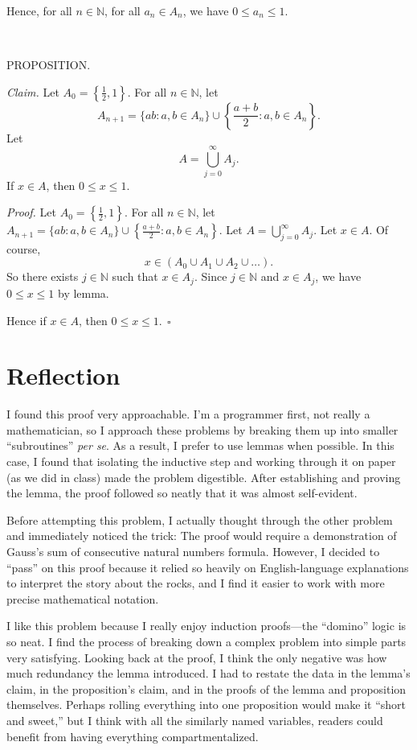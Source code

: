 \documentclass[9pt]{article}
\begin{document}
\noindent Hence, for all $n\in\mathbb{N}$, for all $a_n\in A_n$, we have $0\leq a_n\leq 1$.\newline

~\newline

\noindent\small{PROPOSITION.}\newline

\noindent\textit{Claim. }Let $A_0=\left\{\frac{1}{2},1
\right\}$. For all $n\in\mathbb{N}$, let
\[A_{n+1}=\{ab:a,b\in A_n\}\cup\left\{\frac{a+b}{2}:a,b\in A_n\right\}.\]
Let
\[A=\bigcup_{j=0}^{\infty}{A_j}.\]
If $x\in A$, then $0\leq x\leq 1$.\newline

\noindent\textit{Proof. }Let $A_0=\left\{\frac{1}{2},1
\right\}$. For all $n\in\mathbb{N}$, let $A_{n+1}=\{ab:a,b\in A_n\}\cup\left\{\frac{a+b}{2}:a,b\in A_n\right\}$. Let $A=\bigcup_{j=0}^{\infty}{A_j}$. Let $x\in A$. Of course,
\[x\in(A_0\cup A_1\cup A_2\cup\dots).\]
So there exists $j\in\mathbb{N}$ such that $x\in A_j$. Since $j\in\mathbb{N}$ and $x\in A_j$, we have $0\leq x\leq 1$ by lemma.\newline

\noindent Hence if $x\in A$, then $0\leq x\leq 1.~~\square$
\section*{Reflection}
I found this proof very approachable. I'm a programmer first, not really a mathematician, so I approach these problems by breaking them up into smaller ``subroutines'' \textit{per se}. As a result, I prefer to use lemmas when possible. In this case, I found that isolating the inductive step and working through it on paper (as we did in class) made the problem digestible. After establishing and proving the lemma, the proof followed so neatly that it was almost self-evident. 

Before attempting this problem, I actually thought through the other problem and immediately noticed the trick: The proof would require a demonstration of Gauss's sum of consecutive natural numbers formula. However, I decided to ``pass'' on this proof because it relied so heavily on English-language explanations to interpret the story about the rocks, and I find it easier to work with more precise mathematical notation. 

I like this problem because I really enjoy induction proofs---the ``domino'' logic is so neat. I find the process of breaking down a complex problem into simple parts very satisfying. Looking back at the proof, I think the only negative was how much redundancy the lemma introduced. I had to restate the data in the lemma's claim, in the proposition's claim, and in the proofs of the lemma and proposition themselves. Perhaps rolling everything into one proposition would make it ``short and sweet,'' but I think with all the similarly named variables, readers could benefit from having everything compartmentalized.
\end{document}

